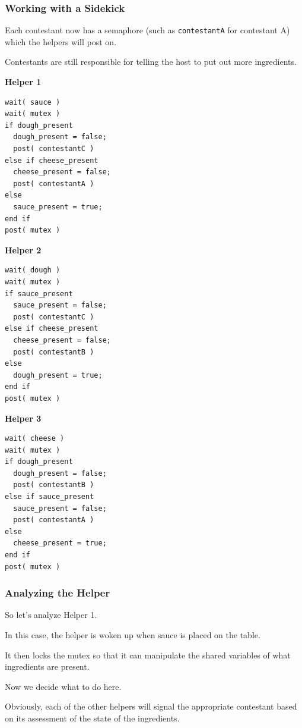 \begin{frame}[fragile]
	\frametitle{Working with a Sidekick}

	Each contestant now has a semaphore (such as \texttt{contestantA} for contestant A) which the helpers will post on.

	Contestants are still responsible for telling the host to put out more ingredients.

	\begin{multicols}{3}
		\textbf{Helper 1}
		\begin{lstlisting}
wait( sauce )
wait( mutex )
if dough_present  
  dough_present = false;
  post( contestantC )
else if cheese_present
  cheese_present = false;
  post( contestantA )
else
  sauce_present = true;
end if  
post( mutex )
\end{lstlisting}
		\columnbreak
		\textbf{Helper 2}
		\begin{lstlisting}
wait( dough )
wait( mutex )
if sauce_present  
  sauce_present = false;
  post( contestantC )
else if cheese_present
  cheese_present = false;
  post( contestantB )
else
  dough_present = true;
end if  
post( mutex )
\end{lstlisting}
		\columnbreak
		\textbf{Helper 3}
		\begin{lstlisting}
wait( cheese )
wait( mutex )
if dough_present  
  dough_present = false;
  post( contestantB )
else if sauce_present
  sauce_present = false;
  post( contestantA )
else
  cheese_present = true;
end if  
post( mutex )
\end{lstlisting}
	\end{multicols}

\end{frame}

\begin{frame}
	\frametitle{Analyzing the Helper}

	So let's analyze Helper 1.

	In this case, the helper is woken up when sauce is placed on the table.

	It then locks the mutex so that it can manipulate the shared variables of what ingredients are present.

	Now we decide what to do here.

	Obviously, each of the other helpers will signal the appropriate contestant based on its assessment of the state of the ingredients.

\end{frame}


